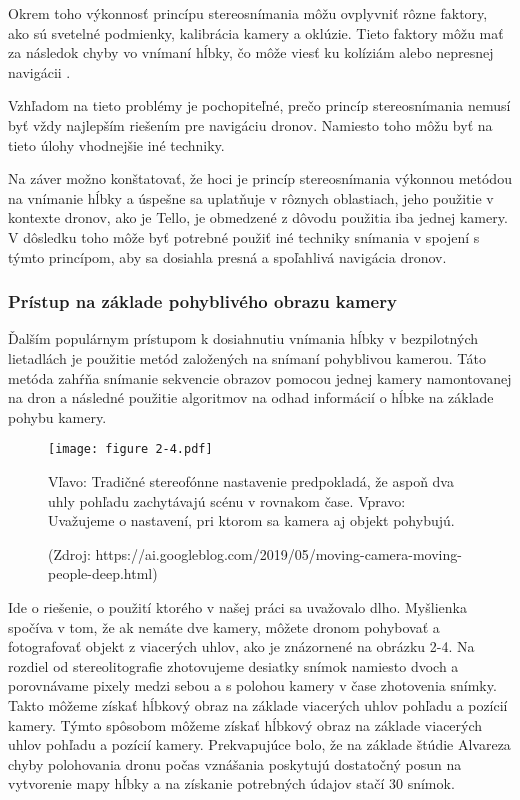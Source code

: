 Okrem toho výkonnosť princípu stereosnímania môžu ovplyvniť rôzne faktory, ako sú svetelné podmienky, kalibrácia kamery a oklúzie. Tieto faktory môžu mať za následok chyby vo vnímaní hĺbky, čo môže viesť ku kolíziám alebo nepresnej navigácii \citep{cui2019design}.

Vzhľadom na tieto problémy je pochopiteľné, prečo princíp stereosnímania nemusí byť vždy najlepším riešením pre navigáciu dronov. Namiesto toho môžu byť na tieto úlohy vhodnejšie iné techniky.

Na záver možno konštatovať, že hoci je princíp stereosnímania výkonnou metódou na vnímanie hĺbky a úspešne sa uplatňuje v rôznych oblastiach, jeho použitie v kontexte dronov, ako je Tello, je obmedzené z dôvodu použitia iba jednej kamery. V dôsledku toho môže byť potrebné použiť iné techniky snímania v spojení s týmto princípom, aby sa dosiahla presná a spoľahlivá navigácia dronov.

\subsubsection{Prístup na základe pohyblivého obrazu kamery}
Ďalším populárnym prístupom k dosiahnutiu vnímania hĺbky v bezpilotných lietadlách je použitie metód založených na snímaní pohyblivou kamerou. Táto metóda zahŕňa snímanie sekvencie obrazov pomocou jednej kamery namontovanej na dron a následné použitie algoritmov na odhad informácií o hĺbke na základe pohybu kamery.

\begin{figure}[ht!]
    \centering
    \texttt{[image: figure 2-4.pdf]}
    \caption{Vľavo: Tradičné stereofónne nastavenie predpokladá, že aspoň dva uhly pohľadu zachytávajú scénu v rovnakom čase. Vpravo: Uvažujeme o nastavení, pri ktorom sa kamera aj objekt pohybujú.}
    \captionsetup{font=footnotesize, justification=centering, skip=5pt}
    \caption*{(Zdroj: https://ai.googleblog.com/2019/05/moving-camera-moving-people-deep.html)}
    \label{o:2-4}
\end{figure}

Ide o riešenie, o použití ktorého v našej práci sa uvažovalo dlho. Myšlienka spočíva v tom, že ak nemáte dve kamery, môžete dronom pohybovať a fotografovať objekt z viacerých uhlov, ako je znázornené na obrázku 2-4. Na rozdiel od stereolitografie zhotovujeme desiatky snímok namiesto dvoch a porovnávame pixely medzi sebou a s polohou kamery v čase zhotovenia snímky. Takto môžeme získať hĺbkový obraz na základe viacerých uhlov pohľadu a pozícií kamery. Týmto spôsobom môžeme získať hĺbkový obraz na základe viacerých uhlov pohľadu a pozícií kamery. 
Prekvapujúce bolo, že na základe štúdie Alvareza \citep{alvarez2016collision} chyby polohovania dronu počas vznášania poskytujú dostatočný posun na vytvorenie mapy hĺbky a na získanie potrebných údajov stačí 30 snímok. 

